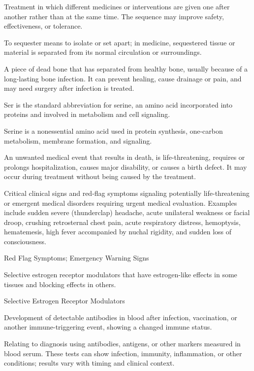  Treatment in which different medicines or interventions are given one after another rather than at the same time. The sequence may improve safety, effectiveness, or tolerance.

 To sequester means to isolate or set apart; in medicine, sequestered tissue or material is separated from its normal circulation or surroundings.

 A piece of dead bone that has separated from healthy bone, usually because of a long-lasting bone infection. It can prevent healing, cause drainage or pain, and may need surgery after infection is treated.

 Ser is the standard abbreviation for serine, an amino acid incorporated into proteins and involved in metabolism and cell signaling.

 Serine is a nonessential amino acid used in protein synthesis, one-carbon metabolism, membrane formation, and signaling.

 An unwanted medical event that results in death, is life-threatening, requires or prolongs hospitalization, causes major disability, or causes a birth defect. It may occur during treatment without being caused by the treatment.

 Critical clinical signs and red-flag symptoms signaling potentially life-threatening or emergent medical disorders requiring urgent medical evaluation. Examples include sudden severe (thunderclap) headache, acute unilateral weakness or facial droop, crushing retrosternal chest pain, acute respiratory distress, hemoptysis, hematemesis, high fever accompanied by nuchal rigidity, and sudden loss of consciousness.

\synonyms
Red Flag Symptoms; Emergency Warning Signs

 Selective estrogen receptor modulators that have estrogen-like effects in some tissues and blocking effects in others.

\synonyms
Selective Estrogen Receptor Modulators

 Development of detectable antibodies in blood after infection, vaccination, or another immune-triggering event, showing a changed immune status.

 Relating to diagnosis using antibodies, antigens, or other markers measured in blood serum. These tests can show infection, immunity, inflammation, or other conditions; results vary with timing and clinical context.

